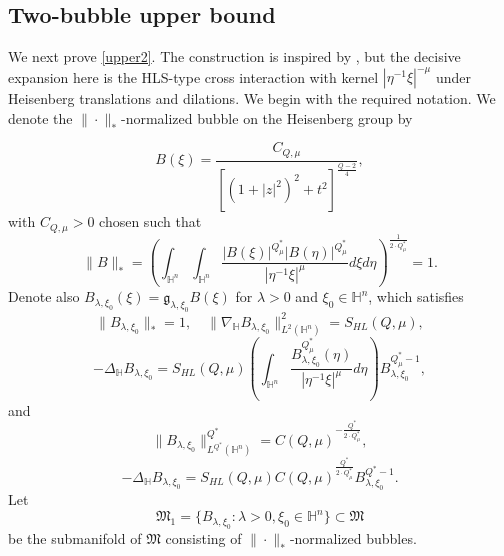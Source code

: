 \documentclass[11pt]{article}
\begin{document}
\endgroup



\subsection{Two-bubble upper bound}
We next prove \eqref{upper2}. The construction is inspired by \cite{K25}, but the decisive expansion here is the HLS-type cross interaction with kernel $|\eta^{-1}\xi|^{-\mu}$ under Heisenberg translations and dilations. We begin with the required notation. We denote the $\|\cdot\|_*$-normalized bubble on the Heisenberg group by


\begin{equation*}
 B(\xi)=\frac{C_{Q,\mu}}{[(1+|z|^{2})^{2}+t^{2}]^{\frac{Q-2}{4}}},
\end{equation*}
with $C_{Q,\mu}>0$ chosen such that
\begin{equation*}
\|B\|_*= \left(\int_{\mathbb{H}^{n}}\int_{\mathbb{H}^{n}}\frac{|B(\xi)|^{Q^{\ast}_{\mu}} |B(\eta)|
^{Q^{\ast}_{\mu}}}{|\eta^{-1}\xi|^{\mu}}{d}\xi{d}\eta\right)^{\frac{1}{2\cdot Q^{\ast}_{\mu}}}=1.
\end{equation*}
Denote also $B_{\lambda,\xi_0}(\xi)=\mathfrak{g}_{\lambda,\xi_0}B(\xi)$ for $\lambda>0$ and $\xi_0\in \mathbb{H}^n$, which satisfies
\begin{equation*}
 \|B_{\lambda,\xi_0}\|_*=1,\quad \|\nabla_\mathbb{H}B_{\lambda,\xi_0}\|_{{L}^{2}(\mathbb{H}^n)}^2=S_{HL}(Q,\mu),
\end{equation*}
\begin{equation}\label{ne1}
 -\Delta_{\mathbb{H}} B_{\lambda,\xi_0}=S_{HL}(Q,\mu)\left(\int_{\mathbb{H}^{n}}\frac{B_{\lambda,\xi_0}
^{Q^{\ast}_{\mu}}(\eta)}{|\eta^{-1}\xi|^{\mu}}{d}\eta\right)B_{\lambda,\xi_0}^{Q^{\ast}_{\mu}-1},
\end{equation}
and
\begin{equation*}
 \|B_{\lambda,\xi_0}\|^{Q^{\ast}}_{L^{Q^{\ast}}(\mathbb{H}^{n})}=C(Q,\mu)^{-\frac{Q^{\ast}}{2\cdot Q^{\ast}_{\mu}}},
\end{equation*}
\begin{equation}\label{ne2}
 -\Delta_{\mathbb{H}} B_{\lambda,\xi_0}=S_{HL}(Q,\mu)C(Q,\mu)^{\frac{Q^{\ast}}{2\cdot Q^{\ast}_{\mu}}}B_{\lambda,\xi_0}^{Q^{\ast}-1}.
\end{equation}
Let
\begin{equation*}
 \mathfrak{M}_1=\{B_{\lambda,\xi_0}:\lambda>0,\xi_0\in \mathbb{H}^n\}\subset \mathfrak{M}
\end{equation*}
be the submanifold of $\mathfrak{M}$ consisting of $\|\cdot\|_*$-normalized bubbles.
\end{document}
